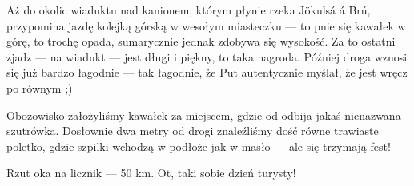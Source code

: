 
Aż do okolic wiaduktu nad kanionem, którym płynie rzeka Jökulsá á Brú,  przypomina jazdę kolejką górską w wesołym miasteczku --- to pnie się kawałek w górę, to trochę opada, sumarycznie jednak zdobywa się wysokość. Za to ostatni zjadz --- na wiadukt --- jest długi i piękny, to taka nagroda. Później droga wznosi się już bardzo łagodnie --- tak łagodnie, że Put autentycznie myślał, że jest wręcz po równym ;)

Obozowisko założyliśmy kawałek za miejscem, gdzie od  odbija jakaś nienazwana szutrówka. Dosłownie dwa metry od drogi znaleźliśmy dość równe trawiaste poletko, gdzie szpilki wchodzą w podłoże jak w masło --- ale się trzymają fest!

Rzut oka na licznik --- 50 km. Ot, taki sobie dzień turysty!

